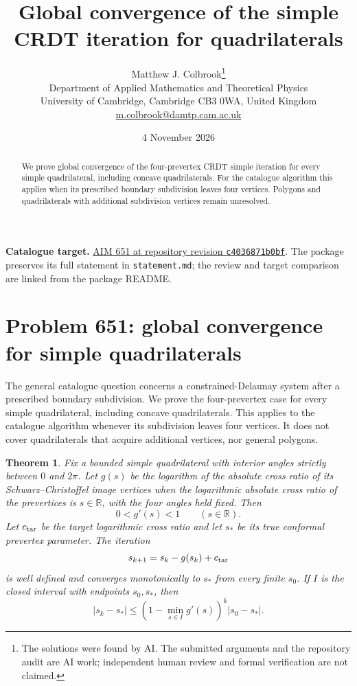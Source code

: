 \documentclass[11pt,a4paper]{article}
\title{Global convergence of the simple CRDT iteration for quadrilaterals}
\author{Matthew J. Colbrook\thanks{The solutions were found by AI. The submitted arguments and the repository audit are AI work; independent human review and formal verification are not claimed.}\\[4pt]
\small Department of Applied Mathematics and Theoretical Physics\\
\small University of Cambridge, Cambridge CB3 0WA, United Kingdom\\
\small\href{mailto:m.colbrook@damtp.cam.ac.uk}{m.colbrook@damtp.cam.ac.uk}}
\date{4 November 2026}
\newcommand{\R}{\mathbb R}
\newcommand{\abs}[1]{\left\lvert#1\right\rvert}
\newtheorem{theorem}{Theorem}[section]
\theoremstyle{definition}
\theoremstyle{remark}
\numberwithin{equation}{section}
\begin{document}
\maketitle
\begin{abstract}
We prove global convergence of the four-prevertex CRDT simple iteration for every simple quadrilateral, including concave quadrilaterals. For the catalogue algorithm this applies when its prescribed boundary subdivision leaves four vertices. Polygons and quadrilaterals with additional subdivision vertices remain unresolved.
\end{abstract}
\noindent\textbf{Catalogue target.} \href{https://github.com/MColbrook/AIM/blob/c4036871b0bf15cbc83e79c780b7191bcbb2cfed/problems/651-simple-crdt-convergence.md}{AIM 651 at repository revision \texttt{c4036871b0bf}}. The package preserves its full statement in \texttt{statement.md}; the review and target comparison are linked from the package README.
\medskip

\section{Problem 651: global convergence for simple quadrilaterals}
\label{sec:crdt}

The general catalogue question concerns a constrained-Delaunay system after a prescribed boundary subdivision\cite{dv1998,bishop2010}. We prove the four-prevertex case for every simple quadrilateral, including concave quadrilaterals. This applies to the catalogue algorithm whenever its subdivision leaves four vertices. It does not cover quadrilaterals that acquire additional vertices, nor general polygons.

\begin{theorem}\label{thm:quad}
Fix a bounded simple quadrilateral with interior angles strictly between $0$ and $2\pi$. Let $g(s)$ be the logarithm of the absolute cross ratio of its Schwarz--Christoffel image vertices when the logarithmic absolute cross ratio of the prevertices is $s\in\R$, with the four angles held fixed. Then
\[
0<g'(s)<1\qquad(s\in\R).
\]
Let $c_{\rm tar}$ be the target logarithmic cross ratio and let $s_*$ be its true conformal prevertex parameter. The iteration
\[
s_{k+1}=s_k-g(s_k)+c_{\rm tar}
\]
is well defined and converges monotonically to $s_*$ from every finite $s_0$. If $I$ is the closed interval with endpoints $s_0,s_*$, then
\[
\abs{s_k-s_*}\le
\left(1-\min_{s\in I}g'(s)\right)^k\abs{s_0-s_*}.
\]
\end{theorem}
\end{document}
